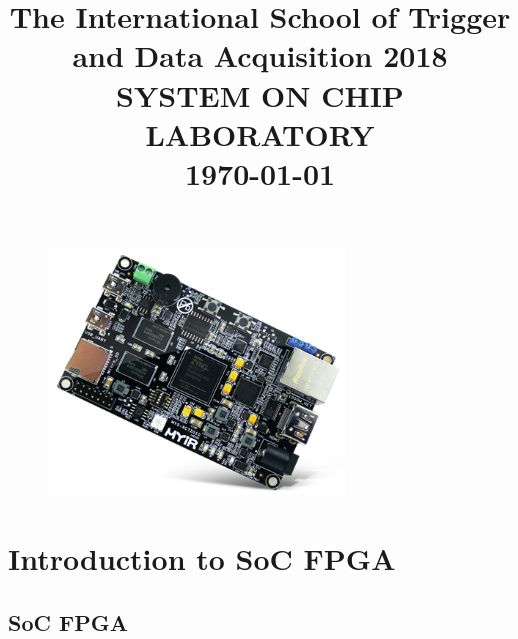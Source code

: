 \documentclass{article}
\begin{document}
\title{ \LARGE \normalsize {The International School of Trigger and Data Acquisition 2018} \vspace{8cm} \\
        \LARGE \textbf{\uppercase{System on Chip Laboratory}} \\ 
        \normalsize \today \vspace*{2\baselineskip}}

\date{}

\maketitle

\begin{figure}[h!]
    \centering
    \includegraphics[width=0.7\textwidth]{img/zturn.png}
\end{figure}


\newpage
\tableofcontents
\newpage

\sectionfont{\scshape}


\section{Introduction to SoC FPGA}

\subsection{SoC FPGA}
\end{document}
